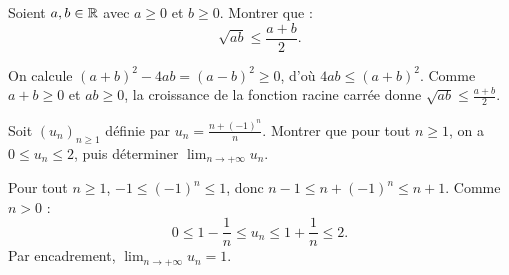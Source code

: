 \documentclass[11pt,a4paper]{article}
\begin{document}

\begin{exercice}
Soient $a, b \in \mathbb{R}$ avec $a \ge 0$ et $b \ge 0$. Montrer que :
\[
  \sqrt{ab} \le \frac{a + b}{2}.
\]
\end{exercice}

\begin{corrige}
On calcule $(a + b)^2 - 4ab = (a - b)^2 \ge 0$, d'où $4ab \le (a + b)^2$. Comme $a + b \ge 0$ et $ab \ge 0$, la croissance de la fonction racine carrée donne $\sqrt{ab} \le \frac{a+b}{2}$.
\end{corrige}

\begin{exercice}
Soit $(u_n)_{n \ge 1}$ définie par $u_n = \frac{n + (-1)^n}{n}$. Montrer que pour tout $n \ge 1$, on a $0 \le u_n \le 2$, puis déterminer $\lim_{n \to +\infty} u_n$.
\end{exercice}

\begin{corrige}
Pour tout $n \ge 1$, $-1 \le (-1)^n \le 1$, donc $n - 1 \le n + (-1)^n \le n + 1$. Comme $n > 0$ :
\[
  0 \le 1 - \frac{1}{n} \le u_n \le 1 + \frac{1}{n} \le 2.
\]
Par encadrement, $\lim_{n \to +\infty} u_n = 1$.
\end{corrige}
\end{document}
